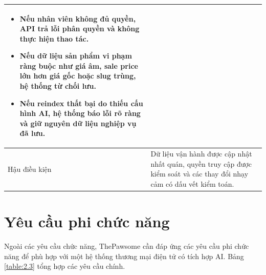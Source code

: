 \documentclass[../DoAn.tex]{subfiles}
\begin{document}
{\begin{longtable}{|p{3.2cm}|p{10.4cm}|}
\begin{minipage}[t]{10.1cm}
\begin{itemize}[leftmargin=*,topsep=0pt,itemsep=0pt]
    \item Nếu nhân viên không đủ quyền, API trả lỗi phân quyền và không thực hiện thao tác.
    \item Nếu dữ liệu sản phẩm vi phạm ràng buộc như giá âm, sale price lớn hơn giá gốc hoặc slug trùng, hệ thống từ chối lưu.
    \item Nếu reindex thất bại do thiếu cấu hình AI, hệ thống báo lỗi rõ ràng và giữ nguyên dữ liệu nghiệp vụ đã lưu.
\end{itemize}
\end{minipage} \\ \hline
Hậu điều kiện & Dữ liệu vận hành được cập nhật nhất quán, quyền truy cập được kiểm soát và các thay đổi nhạy cảm có dấu vết kiểm toán. \\ \hline
\end{longtable}
}

\clearpage
\section{Yêu cầu phi chức năng}
\label{section:2.4}

Ngoài các yêu cầu chức năng, ThePawsome cần đáp ứng các yêu cầu phi chức năng để phù hợp với một hệ thống thương mại điện tử có tích hợp AI. Bảng \ref{table:2.3} tổng hợp các yêu cầu chính.
\end{document}
